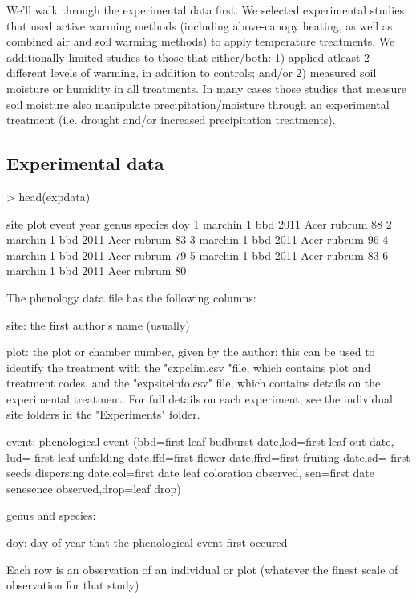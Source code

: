 \documentclass{article}
\begin{document}
We'll walk through the experimental data first. We selected experimental studies that used active warming methods (including above-canopy heating, as well as combined air and soil warming methods) to apply temperature treatments. We additionally limited studies to those that either/both: 1) applied atleast 2 different levels of warming, in addition to controls; and/or 2) measured soil moisture or humidity in all treatments. In many cases those studies that measure soil moisture also manipulate precipitation/moisture through an experimental treatment (i.e. drought and/or increased precipitation treatments).
\subsection{Experimental data}

\begin{Schunk}
\begin{Sinput}
> head(expdata)
\end{Sinput}
\begin{Soutput}
     site plot event year genus species doy
1 marchin    1   bbd 2011  Acer  rubrum  88
2 marchin    1   bbd 2011  Acer  rubrum  83
3 marchin    1   bbd 2011  Acer  rubrum  96
4 marchin    1   bbd 2011  Acer  rubrum  79
5 marchin    1   bbd 2011  Acer  rubrum  83
6 marchin    1   bbd 2011  Acer  rubrum  80
\end{Soutput}
\end{Schunk}
The phenology data file has the following columns:

site: the first author's name (usually)

plot: the plot or chamber number, given by the author; this can be used to identify the treatment with the "expclim.csv "file, which contains plot and treatment codes, and the "expsiteinfo.csv" file, which contains details on the experimental treatment. For full details on each experiment, see the individual site folders in the "Experiments" folder.

event: phenological event (bbd=first leaf budburst date,lod=first leaf out date, lud= first leaf unfolding date,ffd=first flower date,ffrd=first fruiting date,sd= first seeds dispersing date,col=first date leaf coloration observed, sen=first date senesence observed,drop=leaf drop)

genus and species: 

doy: day of year that the phenological event first occured

Each row is an observation of an individual or plot (whatever the finest scale of observation for that study)
\end{document}

